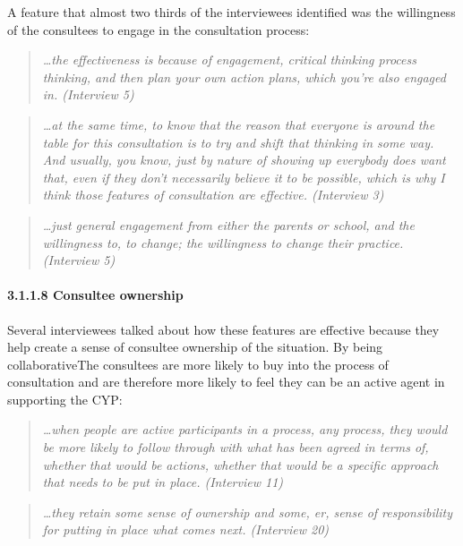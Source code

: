 \documentclass[
  english,
  man]{apa}
\let\oldparagraph\paragraph
\renewcommand{\paragraph}[1]{\oldparagraph{#1}\mbox{}}
\begin{document}
A feature that almost two thirds of the interviewees identified was the willingness of the consultees to engage in the consultation process:

\begin{quote}
\emph{\ldots the effectiveness is because of engagement, critical thinking process
thinking, and then plan your own action plans, which you're also
engaged in. (Interview 5)}
\end{quote}

\begin{quote}
\emph{\ldots at the same time, to know that the reason that everyone is around the
table for this consultation is to try and shift that thinking in some
way. And usually, you know, just by nature of showing up everybody
does want that, even if they don't necessarily believe it to be
possible, which is why I think those features of consultation are
effective. (Interview 3)}
\end{quote}

\begin{quote}
\emph{\ldots just general engagement from either the parents or school, and the
willingness to, to change; the willingness to change their practice.
(Interview 5)}
\end{quote}

\hypertarget{consultee-ownership}{%
\paragraph{3.1.1.8 Consultee ownership}\label{consultee-ownership}}

Several interviewees talked about how these features are effective because they help create a sense of consultee ownership of the situation. By being collaborativeThe consultees are more likely to buy into the process of consultation and are therefore more likely to feel they can be an active agent in supporting the CYP:

\begin{quote}
\emph{\ldots when people are active participants in a process, any process, they
would be more likely to follow through with what has been agreed in
terms of, whether that would be actions, whether that would be a
specific approach that needs to be put in place. (Interview 11)}
\end{quote}

\begin{quote}
\emph{\ldots they retain some sense of ownership and some, er, sense of
responsibility for putting in place what comes next. (Interview 20)}
\end{quote}
\end{document}

